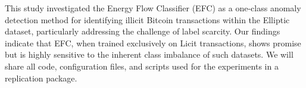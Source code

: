 \documentclass[12pt]{article}
\begin{document}
This study investigated the Energy Flow Classifier (EFC) as a one-class anomaly detection method for identifying illicit
Bitcoin transactions within the Elliptic dataset, particularly addressing the challenge of label scarcity. Our findings
indicate that EFC, when trained exclusively on Licit transactions, shows promise but is highly sensitive to the inherent
class imbalance of such datasets. We will share all code, configuration files, and scripts used for the experiments in a
replication package. 





\end{document}
